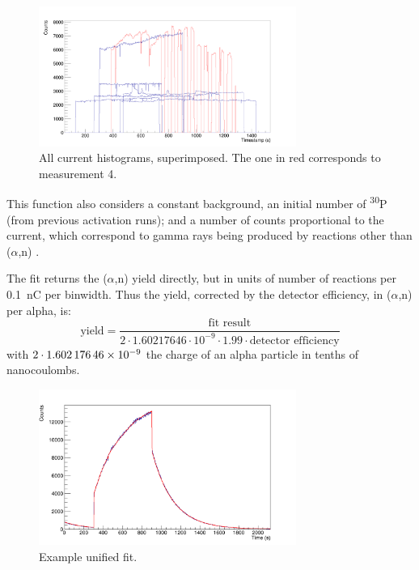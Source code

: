 \documentclass[a4paper,12pt]{report}
\newcommand{\an}{($\alpha$,n) }
\newcommand{\Piso}{\textsuperscript{30}P }
\begin{document}
\begin{figure}[H]
	\centering
	\includegraphics[width=0.75\textwidth]{current_histograms.png}
	\caption{All current histograms, superimposed.
	The one in red corresponds to measurement 4.}
	\label{current_histograms}
\end{figure}

This function also considers a constant background, an initial number of \Piso (from previous activation runs); and a number of counts proportional to the current, which correspond to gamma rays being produced by reactions other than \an.	%

The fit returns the \an yield directly, but in units of number of reactions per \qty{0.1}{\nano\coulomb} per binwidth.
Thus the yield, corrected by the detector efficiency, in \an per alpha, is:
\begin{equation}
	\text{yield} = \frac{\text{fit result}}{2\cdot1.60217646\cdot10^{-9}\cdot 1.99 \cdot \text{detector efficiency}}
\end{equation}
with $2\cdot\num{1.60217646E-9}$ the charge of an alpha particle in tenths of nanocoulombs.
\\

\begin{figure}[H]
	\centering
	\includegraphics[width=0.75\textwidth]{example_unified_fit.png}
	\caption{Example unified fit.}
	\label{example_unified_fit}
\end{figure}
\end{document}
